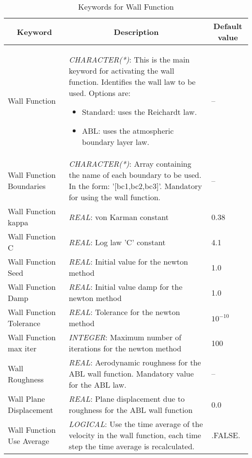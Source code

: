 \documentclass[a4paper,10pt]{report}
\begin{document}
\begin{table}[htbp]
\caption{Keywords for Wall Function}
\begin{tabular}{|l|p{10cm}|p{2.2cm}|}
\hline
\multicolumn{1}{|c|}{Keyword} & \multicolumn{1}{c|}{Description} & \multicolumn{1}{c|}{Default value} \\ \hline

Wall Function					& \textit{CHARACTER(*)}: This is the main keyword for activating the wall function. Identifies the wall law to be used. Options are:
    \begin{itemize}
    \item Standard: uses the Reichardt law.
    \item ABL: uses the atmospheric boundary layer law.
    \end{itemize}
& -- \\ \hline

Wall Function Boundaries 	    & \textit{CHARACTER(*)}: Array containing the name of each boundary to be used. In the form: '[bc1,bc2,bc3]'. Mandatory for using the wall function. & -- \\ \hline

Wall Function kappa		    	& \textit{REAL}: von Karman constant  & 0.38 \\ \hline
Wall Function C     			& \textit{REAL}: Log law 'C' constant  & 4.1 \\ \hline
Wall Function Seed		    	& \textit{REAL}: Initial value for the newton method  & 1.0 \\ \hline
Wall Function Damp		    	& \textit{REAL}: Initial value damp for the newton method & 1.0 \\ \hline
Wall Function Tolerance			& \textit{REAL}: Tolerance for the newton method  & $10^{-10}$ \\ \hline
Wall Function max iter			& \textit{INTEGER}: Maximum number of iterations for the newton method  & 100 \\ \hline
Wall Roughness	        		& \textit{REAL}: Aerodynamic roughness for the ABL wall function. Mandatory value for the ABL law.  & -- \\ \hline
Wall Plane Displacement			& \textit{REAL}: Plane displacement due to roughness for the ABL wall function  & 0.0 \\ \hline
Wall Function Use Average       & \textit{LOGICAL}: Use the time average of the velocity in the wall function, each time step the time average is recalculated. & .FALSE. \\ \hline


\end{tabular}
\label{tab:wallFunckey}
\end{table}
\end{document}
